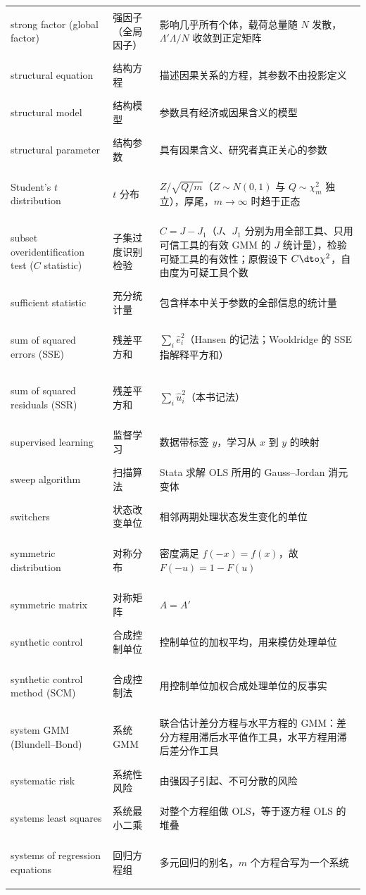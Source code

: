 \begin{longtable}{@{}>{\bfseries\boldmath\raggedright\arraybackslash}p{4.6cm}>{\raggedright\arraybackslash}p{3.2cm}>{\raggedright\arraybackslash}p{\dimexpr\textwidth-7.8cm-4\tabcolsep\relax}@{}}
strong factor (global factor) & 强因子（全局因子） & 影响几乎所有个体，载荷总量随 $N$ 发散，$\Lambda'\Lambda/N$ 收敛到正定矩阵 \\
structural equation & 结构方程 & 描述因果关系的方程，其参数不由投影定义 \\
structural model & 结构模型 & 参数具有经济或因果含义的模型 \\
structural parameter & 结构参数 & 具有因果含义、研究者真正关心的参数 \\
Student's $t$ distribution & $t$ 分布 & $Z/\sqrt{Q/m}$（$Z\sim N(0,1)$ 与 $Q\sim\chi^2_m$ 独立），厚尾，$m\to\infty$ 时趋于正态 \\
subset overidentification test ($C$ statistic) & 子集过度识别检验 & $C=J-J_1$（$J$、$J_1$ 分别为用全部工具、只用可信工具的有效 GMM 的 $J$ 统计量），检验可疑工具的有效性；原假设下 $C\dto\chi^2$，自由度为可疑工具个数 \\
sufficient statistic & 充分统计量 & 包含样本中关于参数的全部信息的统计量 \\
sum of squared errors (SSE) & 残差平方和 & $\sum_i\hat e_i^2$（Hansen 的记法；Wooldridge 的 SSE 指解释平方和） \\
sum of squared residuals (SSR) & 残差平方和 & $\sum_i\hat u_i^2$（本书记法） \\
supervised learning & 监督学习 & 数据带标签 $y$，学习从 $x$ 到 $y$ 的映射 \\
sweep algorithm & 扫描算法 & Stata 求解 OLS 所用的 Gauss--Jordan 消元变体 \\
switchers & 状态改变单位 & 相邻两期处理状态发生变化的单位 \\
symmetric distribution & 对称分布 & 密度满足 $f(-x)=f(x)$，故 $F(-u)=1-F(u)$ \\
symmetric matrix & 对称矩阵 & $A=A'$ \\
synthetic control & 合成控制单位 & 控制单位的加权平均，用来模仿处理单位 \\
synthetic control method (SCM) & 合成控制法 & 用控制单位加权合成处理单位的反事实 \\
system GMM (Blundell--Bond) & 系统 GMM & 联合估计差分方程与水平方程的 GMM：差分方程用滞后水平值作工具，水平方程用滞后差分作工具 \\
systematic risk & 系统性风险 & 由强因子引起、不可分散的风险 \\
systems least squares & 系统最小二乘 & 对整个方程组做 OLS，等于逐方程 OLS 的堆叠 \\
systems of regression equations & 回归方程组 & 多元回归的别名，$m$ 个方程合写为一个系统 \\
\end{longtable}


